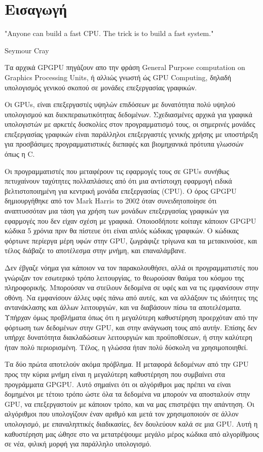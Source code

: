 \chapter{Εισαγωγή}
\epigraph{"Anyone can build a fast CPU. The trick is to build a fast system."}{Seymour Cray}

Τα αρχικά GPGPU πηγάζουν απο την φράση General Purpose computation on Graphics Processing Units, ή αλλιώς γνωστή ώς GPU Computing, δηλαδή υπολογισμός γενικού σκοπού σε μονάδες επεξεργασίας γραφικών.

Οι GPUs, είναι επεξεργαστές υψηλών επιδόσεων με δυνατότητα πολύ υψηλού υπολογισμού και διεκπεραιωτικότητας δεδομένων. Σχεδιασμένες αρχικά για γραφικά υπολογιστών με αρκετές δυσκολίες στον προγραμματισμό τους, οι σημερινές μονάδες επεξεργασίας γραφικών είναι παράλληλοι επεξεργαστές γενικής χρήσης με υποστήριξη για προσβάσιμες προγραμματιστικές διεπαφές και βιομηχανικά πρότυπα γλωσσών όπως η C.

Οι προγραμματιστές που μεταφέρουν τις εφαρμογές τους σε GPUs συνήθως πετυχαίνουν ταχύτητες πολλαπλάσιες από ότι μια αντίστοιχη εφαρμογή ειδικά βελτιστοποιημένη για κεντρική μονάδα επεξεργασίας (CPU).
Ο όρος GPGPU δημιουργήθηκε από τον Mark Harris το 2002 όταν συνειδητοποίησε ότι αναπτυσσόταν μια τάση για χρήση των μονάδων επεξεργασίας γραφικών για εφαρμογές που δεν είχαν σχέση με γραφικά. 
Οποιοσδήποτε κοίταγε κάποιον GPGPU κώδικα 5 χρόνια πριν θα πίστευε ότι είναι απλός κώδικας γραφικών. Ο κώδικας φόρτωνε περίεργα μέρη υφών στην GPU, ζωγράφιζε τρίγωνα και τα μετακινούσε, και τέλος διάβαζε το αποτέλεσμα στην μνήμη, και επαναλάμβανε.

Δεν έβγαζε νόημα για κάποιον να τον παρακολουθήσει, αλλά οι προγραμματιστές που γνώριζαν τον εσωτερικό τρόπο λειτουργίας, το θεωρούσαν θαύμα του κόσμου της πληροφορικής. Μπορούσαν να στείλουν δεδομένα σε υφές και να τις εμφανίσουν στην οθόνη. Να εμφανίσουν άλλες υφές πάνω από αυτές, και να αλλάξουν τις ιδιότητες της αντανάκλασης και άλλων λειτουργιών, και να διαβάσουν πίσω τα αποτελέσματα. Υπήρχαν όμως προβλήματα όπως ότι η μεγαλύτερη καθυστέρηση προερχόταν από την φόρτωση των δεδομένων στην GPU, και στην ανάγνωση τους από αυτήν. Επίσης δεν υπήρχε δυνατότητα διακλαδώσεων λειτουργιών και προϋποθέσεων, ή στην καλύτερη ήταν πολύ περιορισμένη. Τέλος, η γλώσσα ήταν πολύ δύσκολη να χρησιμοποιηθεί. 

Τα δύο πρώτα αποτελούν ακόμα πρόβλημα. Η μεταφορά δεδομένων από την GPU προς την κύρια μνήμη είναι η μεγαλύτερη καθυστέρηση που συμβαίνει στα προγράμματα GPGPU. Αυτό σημαίνει ότι οι αλγόριθμοι μας πρέπει να είναι δομημένοι με τέτοιο τρόπο ώστε όλα τα δεδομένα να μπορούν να αποσταλούν στην GPU, να επεξεργαστούν με κάποιον τρόπο, και να μας επιστρέψει την απάντηση. Οι αλγόριθμοι που υπολογίζουν έναν αριθμό και μετά τον χρησιμοποιούν σε άλλον υπολογισμό, με επαναληπτικές διαδικασίες, δεν δουλεύουν καλά σε μια GPU. Αυτή η καθυστέρηση μας ώθησε στο να μετατρέψουμε μεγάλο μέρος κώδικα από αλγορίθμους σε νέα, φιλική μορφή για παράλληλο υπολογισμό. 

